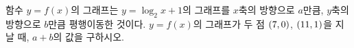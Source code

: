 함수 $y=f(x)$의 그래프는 $y=\log_2 x+1$의 그래프를 $x$축의 방향으로 $a$만큼, $y$축의 방향으로 $b$만큼 평행이동한 것이다. $y=f(x)$의 그래프가 두 점 $(7{,}\mkern3mu\mathopen{}0)$, $(11{,}\mkern3mu\mathopen{}1)$을 지날 때, $a+b$의 값을 구하시오.
